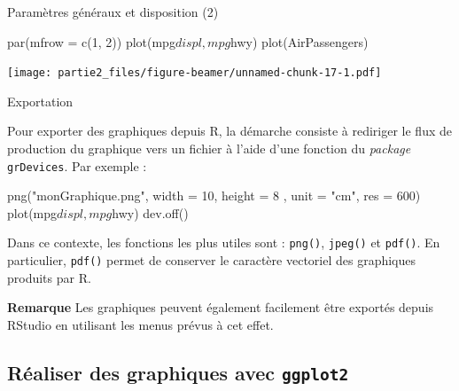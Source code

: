 \documentclass[12pt,ignorenonframetext,]{beamer}
\newenvironment{Shaded}{}{}
\newcommand{\KeywordTok}[1]{\textcolor[rgb]{0.00,0.00,1.00}{#1}}
\newcommand{\DataTypeTok}[1]{#1}
\newcommand{\DecValTok}[1]{#1}
\newcommand{\StringTok}[1]{\textcolor[rgb]{0.00,0.50,0.50}{#1}}
\newcommand{\OperatorTok}[1]{#1}
\newcommand{\NormalTok}[1]{#1}
\renewenvironment{Shaded}{\begin{snugshade}}{\end{snugshade}}
\newcommand{\intertitre}[1]{\textcolor{redInsee}{\textbf{#1}}}
\begin{document}
\begin{frame}[fragile]{Paramètres généraux et disposition (2)}

\begin{Shaded}
\begin{Highlighting}[]
\KeywordTok{par}\NormalTok{(}\DataTypeTok{mfrow =} \KeywordTok{c}\NormalTok{(}\DecValTok{1}\NormalTok{, }\DecValTok{2}\NormalTok{))}
\KeywordTok{plot}\NormalTok{(mpg}\OperatorTok{$}\NormalTok{displ, mpg}\OperatorTok{$}\NormalTok{hwy)}
\KeywordTok{plot}\NormalTok{(AirPassengers)}
\end{Highlighting}
\end{Shaded}

\texttt{[image: partie2\_files/figure-beamer/unnamed-chunk-17-1.pdf]}

\end{frame}

\begin{frame}[fragile]{Exportation}

Pour exporter des graphiques depuis R, la démarche consiste à rediriger
le flux de production du graphique vers un fichier à l'aide d'une
fonction du \emph{package} \texttt{grDevices}. Par exemple :

\pause 

\begin{Shaded}
\begin{Highlighting}[]
\KeywordTok{png}\NormalTok{(}\StringTok{"monGraphique.png"}\NormalTok{, }\DataTypeTok{width =} \DecValTok{10}\NormalTok{, }\DataTypeTok{height =} \DecValTok{8}
\NormalTok{    , }\DataTypeTok{unit =} \StringTok{"cm"}\NormalTok{, }\DataTypeTok{res =} \DecValTok{600}\NormalTok{)}
\KeywordTok{plot}\NormalTok{(mpg}\OperatorTok{$}\NormalTok{displ, mpg}\OperatorTok{$}\NormalTok{hwy)}
\KeywordTok{dev.off}\NormalTok{()}
\end{Highlighting}
\end{Shaded}

\pause Dans ce contexte, les fonctions les plus utiles sont :
\texttt{png()}, \texttt{jpeg()} et \texttt{pdf()}. En particulier,
\texttt{pdf()} permet de conserver le caractère vectoriel des graphiques
produits par R.

\pause 

\intertitre{Remarque} Les graphiques peuvent également facilement être
exportés depuis RStudio en utilisant les menus prévus à cet effet.

\end{frame}

\subsection{\texorpdfstring{Réaliser des graphiques avec
\protect\texttt{ggplot2}}{Réaliser des graphiques avec }}\label{realiser-des-graphiques-avec}
\end{document}
